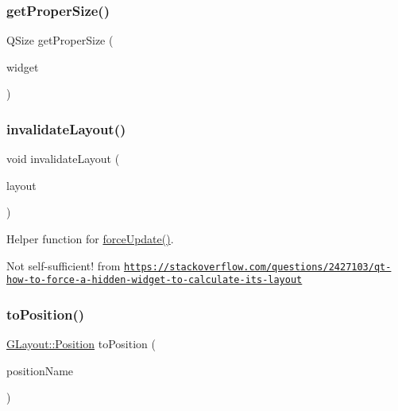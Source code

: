 \mbox{\label{classGLayout_a3efefdab7a54c7818d0a1241726f5621}} 
\subsubsection{\texorpdfstring{get\+Proper\+Size()}{getProperSize()}\hspace{0.1cm}{\footnotesize\ttfamily [2/2]}}
{\footnotesize\ttfamily Q\+Size get\+Proper\+Size (\begin{DoxyParamCaption}\item[{Q\+Widget $\ast$}]{widget }\end{DoxyParamCaption})\hspace{0.3cm}{\ttfamily [static]}}

\mbox{\label{classGLayout_afef413b6041460bf82cfee192eb6f6da}} 
\subsubsection{\texorpdfstring{invalidate\+Layout()}{invalidateLayout()}}
{\footnotesize\ttfamily void invalidate\+Layout (\begin{DoxyParamCaption}\item[{Q\+Layout $\ast$}]{layout }\end{DoxyParamCaption})\hspace{0.3cm}{\ttfamily [static]}}



Helper function for \mbox{\hyperlink{classGLayout_ad3339ee5cb4459fdea04e7e9acf0529b}{force\+Update()}}. 

Not self-\/sufficient! from \href{https://stackoverflow.com/questions/2427103/qt-how-to-force-a-hidden-widget-to-calculate-its-layout}{\tt https\+://stackoverflow.\+com/questions/2427103/qt-\/how-\/to-\/force-\/a-\/hidden-\/widget-\/to-\/calculate-\/its-\/layout} \mbox{\label{classGLayout_ab936632074d7d2a4587747ae4f5665cf}} 
\subsubsection{\texorpdfstring{to\+Position()}{toPosition()}}
{\footnotesize\ttfamily \mbox{\hyperlink{classGLayout_ab91b34ae619fcdfcba4522b4f335bf83}{G\+Layout\+::\+Position}} to\+Position (\begin{DoxyParamCaption}\item[{const std\+::string \&}]{position\+Name }\end{DoxyParamCaption})\hspace{0.3cm}{\ttfamily [static]}}

